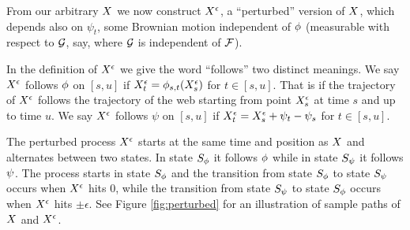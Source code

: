 {

{
\newcommand{\joinernoargs}{\psi}
\newcommand{\joiner}[2]{\joinernoargs_{{#1}{#2}}}
\newcommand{\joinerval}[1]{\joinernoargs_{#1}}
  From our arbitrary $X$ we now construct $X^{\epsilon}$, a
  ``perturbed'' version of $X$, which depends also on
  $\joinerval{t}$,
  some Brownian motion independent of $\phi$ (measurable with
  respect to $\mathcal{G}$, say, where $\mathcal{G}$ is independent of
  $\mathcal{F}$).

  In the definition of $X^{\epsilon}$
  we give the word ``follows'' two distinct meanings.
  We say $X^{\epsilon}$ follows $\phi$ on $[s,u]$ if
  $X^{\epsilon}_t = \phi_{{s},{t}}(X^{\epsilon}_s)$ for $t \in [s,u]$.
  That is if the trajectory of $X^{\epsilon}$ follows the trajectory of
  the web starting from point $X^{\epsilon}_s$ at time $s$ and up to time $u$.
  We say $X^{\epsilon}$ follows $\joinernoargs$ on $[s,u]$ if
  $\resamplede_t = \resamplede_s + \joinerval{t} - \joinerval{s}$ for $t \in [s,u]$.

\begin{definition}
  \label{def:resamplede}
  The perturbed process $X^{\epsilon}$ starts at the same time and position
  as $X$ and
  alternates between two states.
  In state $S_{\phi}$ it follows
  $\phi$ while in state $S_{\psi}$ it follows $\psi$.
  The process starts in state $S_{\phi}$ and
  the transition from state $S_{\phi}$ to state $S_{\psi}$ occurs
  when $X^{\epsilon}$ hits $0$, while
  the transition from state $S_{\psi}$ to state $S_{\phi}$ occurs when
  $X^{\epsilon}$ hits $\pm \epsilon$.
  See Figure \ref{fig:perturbed} for an illustration of sample paths of
  $X$ and $X^{\epsilon}$.
\end{definition}
}

}
